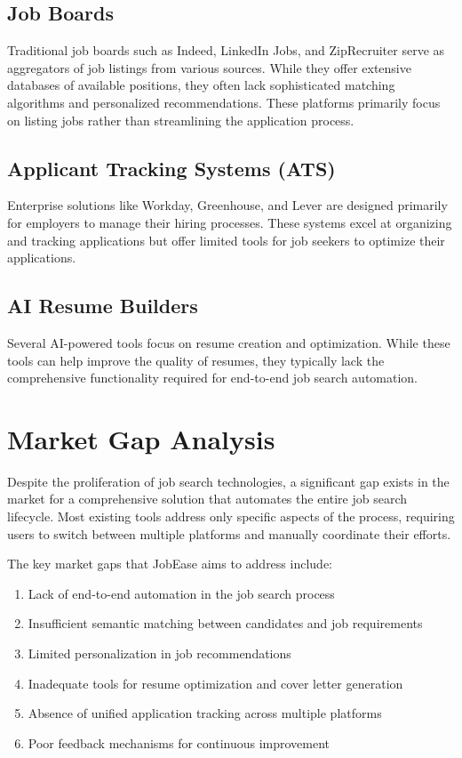 \documentclass[12pt,a4paper]{report}
\begin{document}
\subsection{Job Boards}
Traditional job boards such as Indeed, LinkedIn Jobs, and ZipRecruiter serve as aggregators of job listings from various sources. While they offer extensive databases of available positions, they often lack sophisticated matching algorithms and personalized recommendations. These platforms primarily focus on listing jobs rather than streamlining the application process.

\subsection{Applicant Tracking Systems (ATS)}
Enterprise solutions like Workday, Greenhouse, and Lever are designed primarily for employers to manage their hiring processes. These systems excel at organizing and tracking applications but offer limited tools for job seekers to optimize their applications.

\subsection{AI Resume Builders}
Several AI-powered tools focus on resume creation and optimization. While these tools can help improve the quality of resumes, they typically lack the comprehensive functionality required for end-to-end job search automation.

\section{Market Gap Analysis}
Despite the proliferation of job search technologies, a significant gap exists in the market for a comprehensive solution that automates the entire job search lifecycle. Most existing tools address only specific aspects of the process, requiring users to switch between multiple platforms and manually coordinate their efforts.

The key market gaps that JobEase aims to address include:

\begin{enumerate}[leftmargin=2em]
  \item Lack of end-to-end automation in the job search process
  \item Insufficient semantic matching between candidates and job requirements
  \item Limited personalization in job recommendations
  \item Inadequate tools for resume optimization and cover letter generation
  \item Absence of unified application tracking across multiple platforms
  \item Poor feedback mechanisms for continuous improvement
\end{enumerate}
\end{document}
